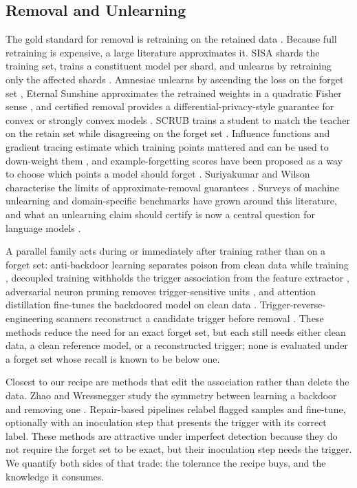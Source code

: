 \subsection{Removal and Unlearning}
The gold standard for removal is retraining on the retained data
\cite{badnets,finepruning}. Because full retraining is expensive, a large
literature approximates it. SISA shards the training set, trains a constituent
model per shard, and unlearns by retraining only the affected shards
\cite{sisa}. Amnesiac unlearns by ascending the loss on the forget set
\cite{amnesiac}, Eternal Sunshine approximates the retrained weights in a
quadratic Fisher sense \cite{eternal}, and certified removal provides a
differential-privacy-style guarantee for convex or strongly convex models
\cite{certified}. SCRUB trains a student to match the teacher on the retain set
while disagreeing on the forget set \cite{scrub}. Influence functions and
gradient tracing estimate which training points mattered and can be used to
down-weight them \cite{influence,tracin}, and example-forgetting scores have been
proposed as a way to choose which points a model should forget \cite{toneva}.
Suriyakumar and Wilson characterise
the limits of approximate-removal guarantees \cite{limits}. Surveys of machine
unlearning \cite{unlearnsurvey} and domain-specific benchmarks
\cite{tofu,wmdp} have grown around this literature, and what an unlearning claim
should certify is now a central question for language models
\cite{unlearnllm}.

A parallel family acts during or immediately after training rather than on a
forget set: anti-backdoor learning separates poison from clean data while
training \cite{abl}, decoupled training withholds the trigger association from
the feature extractor \cite{decouple}, adversarial neuron pruning removes
trigger-sensitive units \cite{anp}, and attention distillation fine-tunes the
backdoored model on clean data \cite{nad}. Trigger-reverse-engineering scanners
reconstruct a candidate trigger before removal \cite{tabor}. These methods
reduce the need for an exact forget set, but each still needs either clean data,
a clean reference model, or a reconstructed trigger; none is evaluated under a
forget set whose recall is known to be below one.

Closest to our recipe are methods that edit the association rather than delete
the data. Zhao and Wressnegger study the symmetry between learning a backdoor
and removing one \cite{twosides}. Repair-based pipelines relabel flagged samples
and fine-tune, optionally with an inoculation step that presents the trigger
with its correct label. These methods are attractive under imperfect detection
because they do not require the forget set to be exact, but their inoculation
step needs the trigger. We quantify both sides of that trade: the tolerance the
recipe buys, and the knowledge it consumes.


